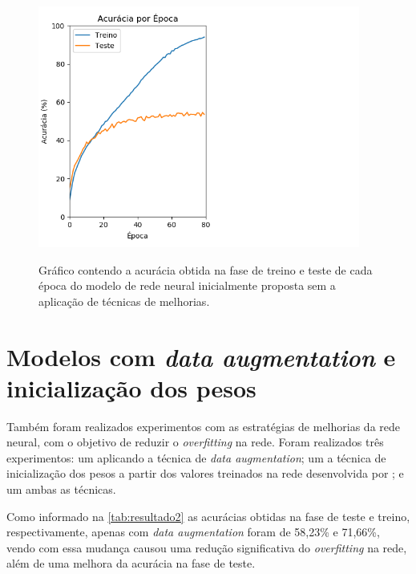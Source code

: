 

\begin{figure}[H]
  \centering
  \caption{Gráfico contendo a acurácia obtida na fase de treino e teste de cada época do modelo de rede neural inicialmente proposta sem a aplicação de técnicas de melhorias.}
  \includegraphics[width=300pt]{dados/figuras/resultado1}
  \label{fig:resultado1}
\end{figure}

\section{Modelos com \textit{data augmentation} e inicialização dos pesos}
Também foram realizados experimentos com as estratégias de melhorias da rede neural, com o objetivo de reduzir o \textit{overfitting} na rede. Foram realizados três experimentos: um aplicando a técnica de \textit{data augmentation}; um a técnica de inicialização dos pesos a partir dos valores treinados na rede desenvolvida por ; e um ambas as técnicas. 

\par Como informado na \autoref{tab:resultado2} as acurácias obtidas na fase de teste e treino, respectivamente, apenas com \textit{data augmentation} foram de 58,23\% e 71,66\%, vendo com essa mudança causou uma redução significativa do \textit{overfitting} na rede, além de uma melhora da acurácia na fase de teste.



